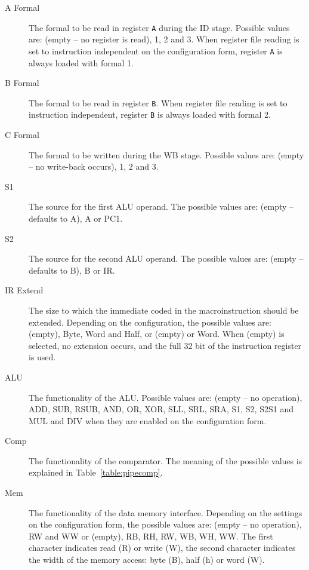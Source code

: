 \documentclass{article}
\begin{document}
\begin{description}
\item[A Formal] The formal to be read in register \texttt{A} during the ID stage. Possible values are: (empty --
 no register is read), 1, 2 and 3. When register file reading is set to 
instruction independent on the configuration form, register \texttt{A} is always loaded with formal 1.
\item[B Formal] The formal to be read in register \texttt{B}. When register file reading is set to instruction independent, register \texttt{B} is always loaded with formal 2.
\item[C Formal] The formal to be written during the WB stage. Possible values are: (empty -- no write-back occurs), 1, 2 and 3.
\item[S1] The source for the first ALU operand. The possible values are: (empty -- defaults to A), A or PC1.
\item[S2] The source for the second ALU operand. The possible values are: (empty -- defaults to B), B or IR.
\item[IR Extend] The size to which the immediate coded in the 
macroinstruction should be extended. Depending on the configuration, the
 possible values are: (empty), Byte, Word and Half, or (empty) or Word. 
When (empty) is selected, no
extension occurs, and the full 32 bit of the instruction register is 
used.
\item[ALU] The functionality of the ALU. Possible values are: (empty --
 no operation), ADD, SUB, RSUB, AND, OR, XOR, SLL, SRL, SRA, S1, S2, 
S2S1 and MUL and DIV when they are enabled on the configuration form.
\item[Comp] The functionality of the comparator. The meaning of the possible values is explained in Table~\ref{table:pipecomp}.
\item[Mem ]The functionality of the data memory interface. 
Depending on the settings on the configuration form, the possible values
 are: (empty -- no operation), RW and WW or (empty), RB, RH, RW,
 WB, WH, WW. The first character indicates read (R) or write (W), the 
second character indicates the width of the memory access: byte (B), 
half (h) or word (W).
\end{description}
\end{document}
